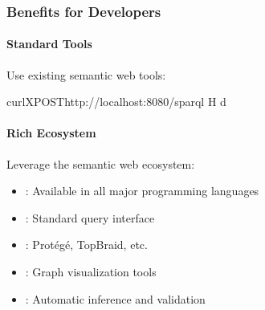 \documentclass[letterpaper,10pt,english]{sphinxmanual}
\begin{document}
\subsubsection{Benefits for Developers}
\label{\detokenize{foundational/intro-to-rdf-blockchain:benefits-for-developers}}

\paragraph{Standard Tools}
\label{\detokenize{foundational/intro-to-rdf-blockchain:standard-tools}}
\sphinxAtStartPar
Use existing semantic web tools:

\begin{sphinxVerbatim}[commandchars=\\\{\}]
curl\PYGZhy{}XPOSThttp://localhost:8080/sparql
\PYGZhy{}H
\PYGZhy{}d
\end{sphinxVerbatim}


\paragraph{Rich Ecosystem}
\label{\detokenize{foundational/intro-to-rdf-blockchain:rich-ecosystem}}
\sphinxAtStartPar
Leverage the semantic web ecosystem:
\begin{itemize}
\item {} 
\sphinxAtStartPar
{}: Available in all major programming languages

\item {} 
\sphinxAtStartPar
{}: Standard query interface

\item {} 
\sphinxAtStartPar
{}: Protégé, TopBraid, etc.

\item {} 
\sphinxAtStartPar
{}: Graph visualization tools

\item {} 
\sphinxAtStartPar
{}: Automatic inference and validation

\end{itemize}
\end{document}
